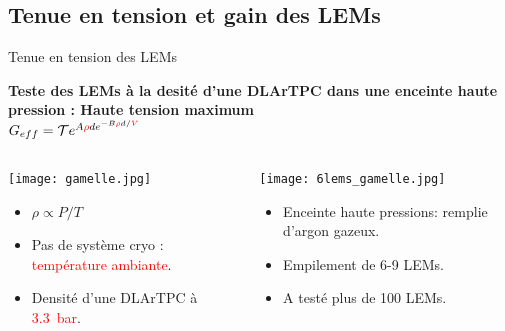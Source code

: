     \subsection[Tension et gain]{Tenue en tension et gain des LEMs}

    \begin{frame}{Tenue en tension des LEMs}
    	\begin{scriptsize}
    		\begin{center}
    			\textbf{Teste des LEMs à la desité d'une DLArTPC dans une enceinte haute pression : Haute tension maximum}\\
    			$G _{eff}= \mathcal{T}e^{A\textcolor{red}{\rho} d e^{-B\textcolor{red}{\rho}d/\textcolor{red}{V}}}$
    		\end{center} 
    		\begin{columns}
		    	\begin{column}{0.5\textwidth}
		    		\texttt{[image: gamelle.jpg]}\\
		    		\begin{itemize}
		    			\item $\rho \propto P/T$
		    			\item Pas de système cryo : \textcolor{red}{température ambiante}.
		    			\item Densité d'une DLArTPC à \textcolor{red}{\SI{3.3}{\bar}}.
		    		\end{itemize}
		    	\end{column}\hfill
		    	\begin{column}{0.5\textwidth}
		    		\texttt{[image: 6lems\_gamelle.jpg]}\\
		    		\begin{itemize}
		    			\item Enceinte haute pressions: remplie d'argon gazeux.
		    			\item Empilement de 6-9 LEMs.
		    			\item A testé plus de 100 LEMs.
		    		\end{itemize}
		    	\end{column}
		    \end{columns}
	    \end{scriptsize} 
    \end{frame}


